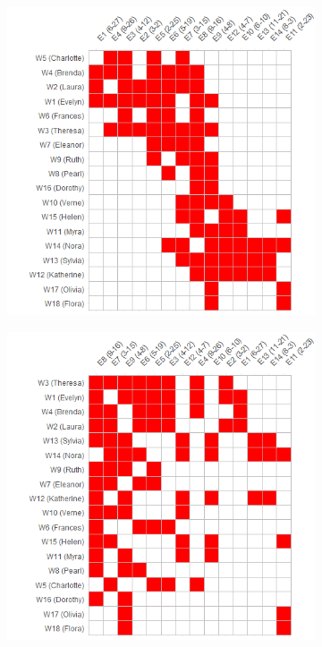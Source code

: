 \documentclass[a4paper,fleqn]{cas-sc}
\begin{document}
\begin{figure}[ht!]
    \captionsetup[subfigure]{font=footnotesize,labelfont=footnotesize}
    \centering
     \begin{subfigure}[b]{0.45\textwidth}
        \includegraphics[width=1.0\textwidth]{Plots/ca-reord1.png}
            \caption{}
            \label{fig:ca-reord1}
    \end{subfigure}
     \begin{subfigure}[b]{0.45\textwidth}
        \includegraphics[width=1.0\textwidth]{Plots/bon-reord1.png}

\end{subfigure}
\end{figure}
\end{document}
